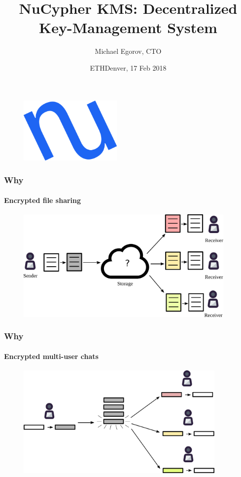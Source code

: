 \documentclass[xetex,mathsans,sans,aspectratio=169]{beamer}
\title[NuCypher KMS]{NuCypher KMS: Decentralized Key-Management System}
\author[Michael]{Michael Egorov, CTO}
\date[15 Feb 2018]{ETHDenver, 17 Feb 2018}
\begin{document}
    \begin{frame}
        \titlepage
        \begin{figure}
            \centering
            \includegraphics[width=5cm]{pdf/nucypher_logo.pdf}
        \end{figure}
    \end{frame}

    \begin{frame}
        \frametitle{Why}
        \framesubtitle{Encrypted file sharing}
        \begin{figure}
            \centering
            \includegraphics[height=5.5cm]{pdf/file-sharing.pdf}
        \end{figure}
    \end{frame}

    \begin{frame}
        \frametitle{Why}
        \framesubtitle{Encrypted multi-user chats}
        \begin{figure}
            \centering
            \includegraphics[height=5.5cm]{pdf/chats.pdf}
        \end{figure}
    \end{frame}
\end{document}
